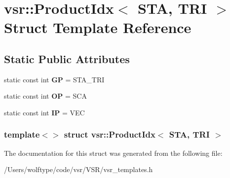 \hypertarget{structvsr_1_1_product_idx_3_01_s_t_a_00_01_t_r_i_01_4}{\section{vsr\-:\-:Product\-Idx$<$ S\-T\-A, T\-R\-I $>$ Struct Template Reference}
\label{structvsr_1_1_product_idx_3_01_s_t_a_00_01_t_r_i_01_4}
}
\subsection*{Static Public Attributes}
\begin{DoxyCompactItemize}
\item 
\hypertarget{structvsr_1_1_product_idx_3_01_s_t_a_00_01_t_r_i_01_4_aa45fc9f9f226d3fb35fd6813f23028b8}{static const int {\bfseries G\-P} = S\-T\-A\-\_\-\-T\-R\-I}\label{structvsr_1_1_product_idx_3_01_s_t_a_00_01_t_r_i_01_4_aa45fc9f9f226d3fb35fd6813f23028b8}

\item 
\hypertarget{structvsr_1_1_product_idx_3_01_s_t_a_00_01_t_r_i_01_4_a7f91409f6362ecf4b380773cbb37c6a5}{static const int {\bfseries O\-P} = S\-C\-A}\label{structvsr_1_1_product_idx_3_01_s_t_a_00_01_t_r_i_01_4_a7f91409f6362ecf4b380773cbb37c6a5}

\item 
\hypertarget{structvsr_1_1_product_idx_3_01_s_t_a_00_01_t_r_i_01_4_ab78a85ea4219c20d9288ab599168ede3}{static const int {\bfseries I\-P} = V\-E\-C}\label{structvsr_1_1_product_idx_3_01_s_t_a_00_01_t_r_i_01_4_ab78a85ea4219c20d9288ab599168ede3}

\end{DoxyCompactItemize}
\subsubsection*{template$<$$>$ struct vsr\-::\-Product\-Idx$<$ S\-T\-A, T\-R\-I $>$}



The documentation for this struct was generated from the following file\-:\begin{DoxyCompactItemize}
\item 
/\-Users/wolftype/code/vsr/\-V\-S\-R/vsr\-\_\-templates.\-h\end{DoxyCompactItemize}
